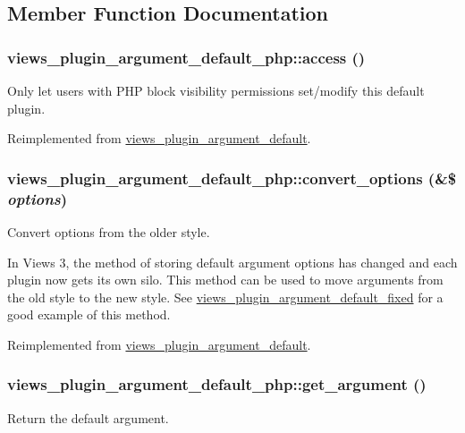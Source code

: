 \subsection{Member Function Documentation}
\hypertarget{classviews__plugin__argument__default__php_aff864fbd2dcbea7ecd3589429bbf3a2a}{
\subsubsection[{access}]{\setlength{\rightskip}{0pt plus 5cm}views\_\-plugin\_\-argument\_\-default\_\-php::access ()}}
\label{classviews__plugin__argument__default__php_aff864fbd2dcbea7ecd3589429bbf3a2a}
Only let users with PHP block visibility permissions set/modify this default plugin. 

Reimplemented from \hyperlink{classviews__plugin__argument__default_a47b0a69da2fb0e45c25aa9c8727f912f}{views\_\-plugin\_\-argument\_\-default}.\hypertarget{classviews__plugin__argument__default__php_ab95fe7eaef0011eef60a382224095ede}{
\subsubsection[{convert\_\-options}]{\setlength{\rightskip}{0pt plus 5cm}views\_\-plugin\_\-argument\_\-default\_\-php::convert\_\-options (\&\$ {\em options})}}
\label{classviews__plugin__argument__default__php_ab95fe7eaef0011eef60a382224095ede}
Convert options from the older style.

In Views 3, the method of storing default argument options has changed and each plugin now gets its own silo. This method can be used to move arguments from the old style to the new style. See \hyperlink{classviews__plugin__argument__default__fixed}{views\_\-plugin\_\-argument\_\-default\_\-fixed} for a good example of this method. 

Reimplemented from \hyperlink{classviews__plugin__argument__default_a4f4afb816d9f6451a7d070fa7b75c8c2}{views\_\-plugin\_\-argument\_\-default}.\hypertarget{classviews__plugin__argument__default__php_a2f714a25b2da5a135daa28adfab84eb9}{
\subsubsection[{get\_\-argument}]{\setlength{\rightskip}{0pt plus 5cm}views\_\-plugin\_\-argument\_\-default\_\-php::get\_\-argument ()}}
\label{classviews__plugin__argument__default__php_a2f714a25b2da5a135daa28adfab84eb9}
Return the default argument.

